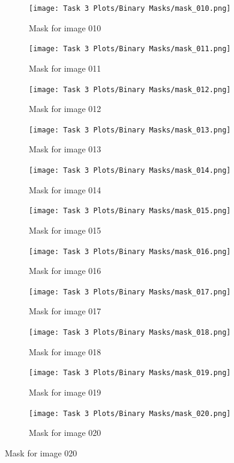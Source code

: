 \documentclass[11pt]{report}
\begin{document}
\begin{figure}[H]
\begin{subfigure}{0.24\textwidth}
    \end{subfigure}
    \begin{subfigure}{0.24\textwidth}
        \centering
        \texttt{[image: Task 3 Plots/Binary Masks/mask\_010.png]}
        \caption{Mask for image 010}
        \label{fig:kbinmask10}
    \end{subfigure}
    \begin{subfigure}{0.24\textwidth}
        \centering
        \texttt{[image: Task 3 Plots/Binary Masks/mask\_011.png]}
        \caption{Mask for image 011}
        \label{fig:kbinmask11}
    \end{subfigure}
    \begin{subfigure}{0.24\textwidth}
        \centering
        \texttt{[image: Task 3 Plots/Binary Masks/mask\_012.png]}
        \caption{Mask for image 012}
        \label{fig:kbinmask12}
    \end{subfigure}
    \begin{subfigure}{0.24\textwidth}
        \centering
        \texttt{[image: Task 3 Plots/Binary Masks/mask\_013.png]}
        \caption{Mask for image 013}
        \label{fig:kbinmask13}
    \end{subfigure}
    \begin{subfigure}{0.24\textwidth}
        \centering
        \texttt{[image: Task 3 Plots/Binary Masks/mask\_014.png]}
        \caption{Mask for image 014}
        \label{fig:kbinmask14}
    \end{subfigure}
    \begin{subfigure}{0.24\textwidth}
        \centering
        \texttt{[image: Task 3 Plots/Binary Masks/mask\_015.png]}
        \caption{Mask for image 015}
        \label{fig:kbinmask15}
    \end{subfigure}
    \begin{subfigure}{0.24\textwidth}
        \centering
        \texttt{[image: Task 3 Plots/Binary Masks/mask\_016.png]}
        \caption{Mask for image 016}
        \label{fig:kbinmask16}
    \end{subfigure}
    \begin{subfigure}{0.24\textwidth}
        \centering
        \texttt{[image: Task 3 Plots/Binary Masks/mask\_017.png]}
        \caption{Mask for image 017}
        \label{fig:kbinmask17}
    \end{subfigure}
    \begin{subfigure}{0.24\textwidth}
        \centering
        \texttt{[image: Task 3 Plots/Binary Masks/mask\_018.png]}
        \caption{Mask for image 018}
        \label{fig:kbinmask18}
    \end{subfigure}
    \begin{subfigure}{0.24\textwidth}
        \centering
        \texttt{[image: Task 3 Plots/Binary Masks/mask\_019.png]}
        \caption{Mask for image 019}
        \label{fig:kbinmask19}
    \end{subfigure}
    \begin{subfigure}{0.24\textwidth}
        \centering
        \texttt{[image: Task 3 Plots/Binary Masks/mask\_020.png]}
        \caption{Mask for image 020}
        \label{fig:kbinmask20}
    \end{subfigure}


\end{figure}
\end{document}
